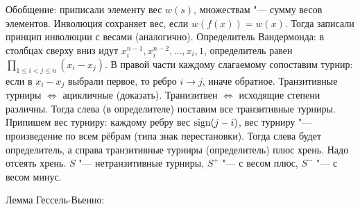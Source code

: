 Обобщение: приписали элементу вес $w(s)$, множествам "--- сумму весов элементов.
Инволюция сохраняет вес, если $w(f(x))=w(x)$.
Тогда записали принцип инволюции с весами (аналогично).
Определитель Вандермонда: в столбцах сверху вниз идут $x_i^{n-1}, x_i^{n-2}, \dots, x_i, 1$, определитель равен
$\prod_{1 \le i < j \le n} (x_i - x_j)$.
В правой части каждому слагаемому сопоставим турнир: если в $x_i-x_j$ выбрали первое, то ребро $i\to j$, иначе обратное.
Транзитивные турниры $\iff$ ацикличные (доказать).
Транизитвен $\iff$ исходящие степени различны.
Тогда слева (в определителе) поставим все транзитивные турниры.
Припишем вес турниру: каждому ребру вес $\operatorname{sign} (j-i)$, вес турниру "--- произведение по всем рёбрам (типа знак перестановки).
Тогда слева будет определитель, а справа транзитивные турниры (определитель) плюс хрень.
Надо отсеять хрень.
$S$ "--- нетранзитивные турниры, $S^+$ "--- с весом плюс, $S^-$ "--- с весом минус.
\TODO

Лемма Гессель-Вьенно: \TODO

